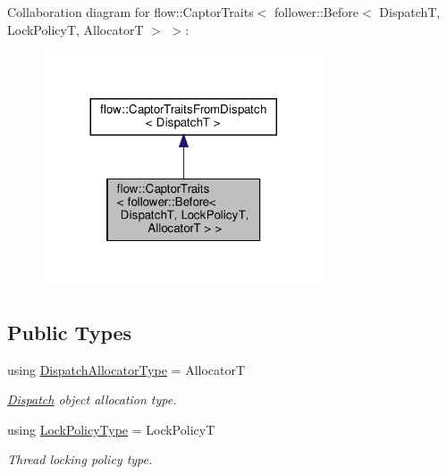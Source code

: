 Collaboration diagram for flow\+:\+:Captor\+Traits$<$ follower\+:\+:Before$<$ DispatchT, Lock\+PolicyT, AllocatorT $>$ $>$\+:\nopagebreak
\begin{figure}[H]
\begin{center}
\leavevmode
\includegraphics[width=236pt]{structflow_1_1_captor_traits_3_01follower_1_1_before_3_01_dispatch_t_00_01_lock_policy_t_00_01_a550b913694820b6d21d877f89ccad265}
\end{center}
\end{figure}
\subsection*{Public Types}
\begin{DoxyCompactItemize}
\item 
\mbox{\label{structflow_1_1_captor_traits_3_01follower_1_1_before_3_01_dispatch_t_00_01_lock_policy_t_00_01_allocator_t_01_4_01_4_a6fe51f3cf4b0617daee81dbd394d85d6}} 
using \hyperlink{structflow_1_1_captor_traits_3_01follower_1_1_before_3_01_dispatch_t_00_01_lock_policy_t_00_01_allocator_t_01_4_01_4_a6fe51f3cf4b0617daee81dbd394d85d6}{Dispatch\+Allocator\+Type} = AllocatorT
\begin{DoxyCompactList}\small\item\em \hyperlink{classflow_1_1_dispatch}{Dispatch} object allocation type. \end{DoxyCompactList}\item 
\mbox{\label{structflow_1_1_captor_traits_3_01follower_1_1_before_3_01_dispatch_t_00_01_lock_policy_t_00_01_allocator_t_01_4_01_4_a49b67a90260e4ec0c4d345b4bea7ac18}} 
using \hyperlink{structflow_1_1_captor_traits_3_01follower_1_1_before_3_01_dispatch_t_00_01_lock_policy_t_00_01_allocator_t_01_4_01_4_a49b67a90260e4ec0c4d345b4bea7ac18}{Lock\+Policy\+Type} = Lock\+PolicyT
\begin{DoxyCompactList}\small\item\em Thread locking policy type. \end{DoxyCompactList}\end{DoxyCompactItemize}


